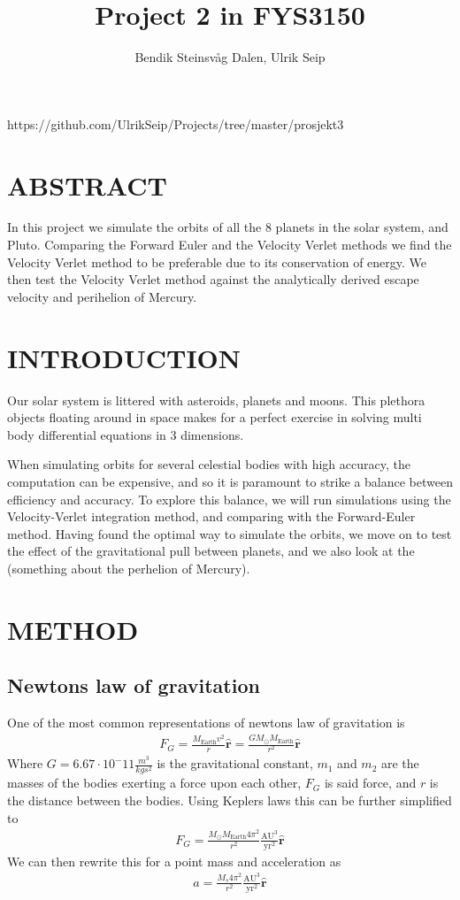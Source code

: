 \documentclass[a4paper]{article}
\title{Project 2 in FYS3150}
\author{Bendik Steinsvåg Dalen, Ulrik Seip}
\begin{document}
\maketitle

https://github.com/UlrikSeip/Projects/tree/master/prosjekt3

\section{ABSTRACT}
In this project we simulate the orbits of all the 8 planets in the solar system, and Pluto. Comparing the Forward Euler and the Velocity Verlet methods we find the Velocity Verlet method to be preferable due to its conservation of energy. We then test the Velocity Verlet method against the analytically derived escape velocity and perihelion of Mercury.

\section{INTRODUCTION}
Our solar system is littered with asteroids, planets and moons. This plethora objects floating around in space makes for a perfect exercise in solving multi body differential equations in 3 dimensions.

When simulating orbits for several celestial bodies with high accuracy, the computation can be expensive, and so it is paramount to strike a balance  between efficiency and accuracy. To explore this balance, we will run simulations using the Velocity-Verlet integration method, and comparing with the Forward-Euler method. Having found the optimal way to simulate the orbits, we move on to test the effect of the gravitational pull between planets, and we also look at the (something about the perhelion of Mercury).


\section{METHOD}
\subsection{Newtons law of gravitation}
One of the most common representations of newtons law of gravitation is
\begin{align}
F_{G} = \frac{M_{\text{Earth}}v^{2}}{r}\boldsymbol{\hat{r}} = \frac{GM_{\odot} M_{\text{Earth}}}{r^{2}}\boldsymbol{\hat{r}}
\end{align}
Where $G=6.67\cdot10^-11\frac{m^3}{kgs^2}$ is the gravitational constant, $m_1$ and $m_2$ are the masses of the bodies exerting a force upon each other, $F_G$ is said force, and $r$ is the distance between the bodies. Using Keplers laws this can be further simplified to
\begin{align}
F_G=\frac{{M_{\odot}M_\text{Earth}}4\pi^{2}}{r^{2}}\frac{\mathrm{AU}^{3}}{\mathrm{yr}^{2}}\boldsymbol{\hat{r}}
\end{align}
We can then rewrite this for a point mass and acceleration as
\begin{align}
a=\frac{{M_{s}}4\pi^{2}}{r^{2}}\frac{\mathrm{AU}^{3}}{\mathrm{yr}^{2}}\boldsymbol{\hat{r}}
\end{align} 
\end{document}

